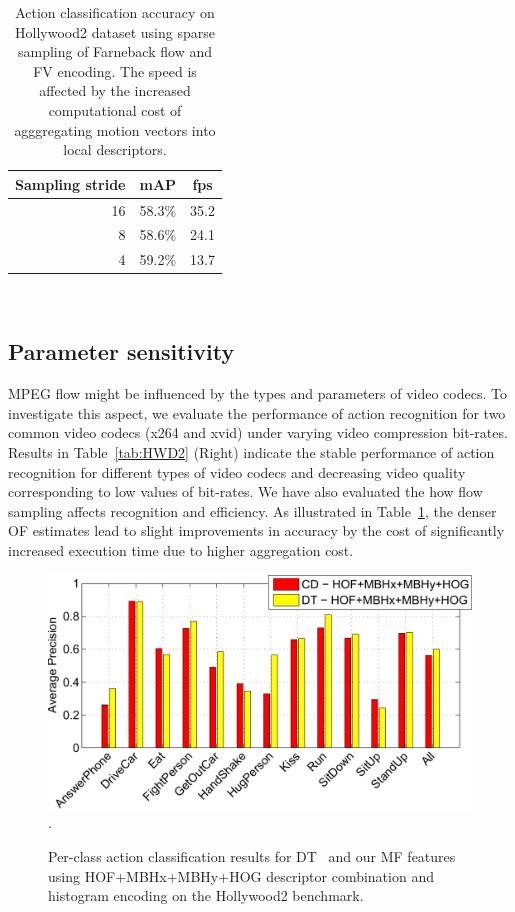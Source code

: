 \documentclass[10pt,twocolumn,letterpaper]{article}
\begin{document}
\begin{table}
\begin{center}
\vspace{-.1cm}
\begin{tabular}{|r|c|c|}
\hline
Sampling stride & mAP & fps \\\hline
16  	& 58.3\% & 35.2	\\\hline
8	& 58.6\% & 24.1	\\\hline
4     	& 59.2\% & 13.7	\\\hline
\end{tabular}
\mbox{}\vspace{.2cm}\\
\caption{Action classification accuracy on Hollywood2 dataset using sparse sampling of Farneback flow and FV encoding. The speed is affected by the increased computational cost of agggregating motion vectors into local descriptors.\vspace{-.4cm}}
\label{tab:flow_resample}
\end{center}
\end{table}

\subsection{Parameter sensitivity}
MPEG flow might be influenced by the types and parameters of video codecs. To investigate this aspect, we evaluate the performance of action recognition for two common video codecs (x264 and xvid) under varying video compression bit-rates. Results in Table~\ref{tab:HWD2} (Right) indicate the stable performance of action recognition for different types of video codecs and decreasing video quality corresponding to low values of bit-rates. We have also evaluated the how flow sampling affects recognition and efficiency. As illustrated in Table~\ref{tab:flow_resample}, the denser OF estimates lead to slight improvements in accuracy by the cost of significantly increased execution time due to higher aggregation cost.

\begin{figure}
\begin{center}
\includegraphics[width=.9\linewidth]{figures/hollywood2-per-class-barplot-crop.pdf}.
\caption{Per-class action classification results for DT~\cite{Wang12} and our  MF features using HOF+MBHx+MBHy+HOG descriptor combination and histogram encoding on the Hollywood2 benchmark.\vspace{-.1cm}}
\label{fig:hwd2-barplot}
\end{center}
\end{figure}
\end{document}

